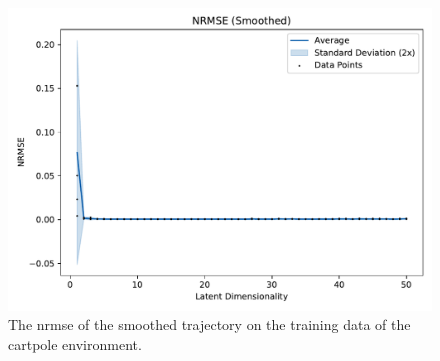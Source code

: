			\begin{figure}
				\centering
				\includegraphics[width=0.7\linewidth]{figures/results/cartpole-gym/latent-dim/comparison-rmse-smoothed-normalized-mean-vs-latent-dim.pdf}
				\caption{The \ac{nrmse} of the smoothed trajectory on the training data of the cartpole environment.}
				\label{fig:cartpoleRmseSmoothed}
			\end{figure}

